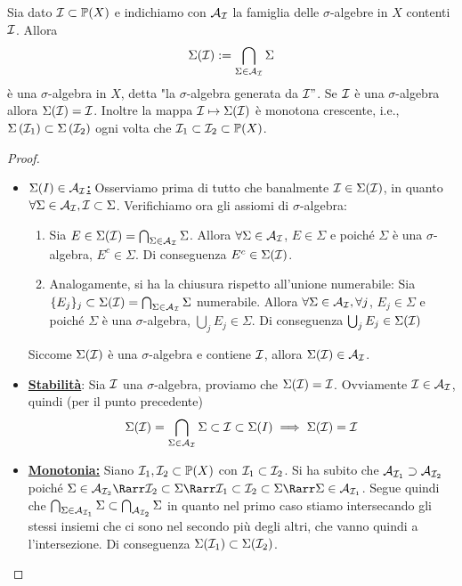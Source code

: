 \begin{proposition}[$*$]\label{prop: sigma algbra generata}Sia dato $\mathcal{I} \subset \mathbb{P}(X)$ e indichiamo con $\mathcal{A}_{\mathcal{I}}$ la famiglia delle $\sigma$-algebre in $X$ contenti $\mathcal{I}$. Allora
\[
\Sigma(\mathcal{I}):=\bigcap_{\Sigma \in \mathcal{A}_{\mathcal{I}}} \Sigma
\]
è una $\sigma$-algebra in $X$, detta "la $\sigma$-algebra generata da $\mathcal{I} "$. Se $\mathcal{I}$ è una $\sigma$-algebra allora $\Sigma(\mathcal{I})=\mathcal{I}$. Inoltre la mappa $\mathcal{I} \mapsto \Sigma(\mathcal{I})$ è monotona crescente, i.e., $\Sigma\left(\mathcal{I}_{1}\right) \subset \Sigma\left(\mathcal{I}_{2}\right)$ ogni volta che $\mathcal{I}_{1} \subset \mathcal{I}_{2} \subset \mathbb{P}(X)$.
\end{proposition}
\begin{proof}~
  \begin{itemize}
      \item \underline{\bf$\Sigma(I)\in\mathcal{A_I}$:} Osserviamo prima di tutto che banalmente $\mathcal{I}\in \Sigma(\mathcal{I})$, in quanto $\forall \Sigma \in \mathcal{A_I}, \mathcal{I}\subset \Sigma$. Verifichiamo ora gli assiomi di $\sigma$-algebra:
      \begin{enumerate}[label=(\arabic*)]
          \item Sia $E\in \Sigma(\mathcal{I})=\bigcap_{\Sigma\in\mathcal{A_I}}\Sigma$. Allora $\forall \Sigma\in \mathcal{A_I}$, $E\in \Sigma$ e poiché $\Sigma$ è una $\sigma$-algebra, $E^c\in \Sigma$. Di conseguenza $E^c\in \Sigma(\mathcal{I})$.
          \item Analogamente, si ha la chiusura rispetto all'unione numerabile: Sia $\{E_j\}_j\subset \Sigma(\mathcal{I})=\bigcap_{\Sigma\in\mathcal{A_I}}\Sigma$ numerabile. Allora $\forall \Sigma\in \mathcal{A_I}, \forall j$, $E_j\in \Sigma$ e poiché $\Sigma$ è una $\sigma$-algebra, $\bigcup_{j}E_j\in \Sigma$. Di conseguenza $\bigcup_jE_j\in \Sigma(\mathcal{I})$
      \end{enumerate} 
      Siccome $\Sigma(\mathcal{I})$ è una $\sigma$-algebra e contiene $\mathcal{I}$, allora $\Sigma(\mathcal{I})\in \mathcal{A_I}$.
      \item \textbf{\underline{Stabilità}}: Sia $\mathcal{I}$ una $\sigma$-algebra, proviamo che  $\Sigma(\mathcal{I})=\mathcal{I}$. Ovviamente $\mathcal{I}\in \mathcal{A_I}$, quindi (per il punto precedente)
      \[\Sigma(\mathcal{I})=\bigcap_{\Sigma\in\mathcal{A_I}}\Sigma\subset \mathcal{I}\subset \Sigma(I)\implies \Sigma(\mathcal{I})=\mathcal{I}\]
      \item \underline{\textbf{Monotonia:}} Siano $\mathcal{I}_1, \mathcal{I}_2\subset \mathbb{P}(X)$ con $\mathcal{I}_1\subset\mathcal{I}_2$. Si ha subito che $\mathcal{A}_{\mathcal{I}_1}\supset \mathcal{A}_{\mathcal{I}_2}$ poiché $\Sigma\in \mc{A}_{\mc{I}_2} \Rarr \mc{I}_2\subset \Sigma \Rarr \mc{I}_1 \subset \mc{I}_2 \subset \Sigma \Rarr \Sigma\in \mc{A}_{\mc{I}_1}$. Segue quindi che $\bigcap_{\Sigma\in \mathcal{A}_{\mathcal{I}_1}}\Sigma \subset \bigcap_{\mathcal{A}_{\mathcal{I}_2}}\Sigma$ in quanto nel primo caso stiamo intersecando gli stessi insiemi che ci sono nel secondo più degli altri, che vanno quindi a  l'intersezione. Di conseguenza $\Sigma(\mathcal{I}_1)\subset \Sigma(\mathcal{I}_2)$.\qedhere
  \end{itemize}
\end{proof}

